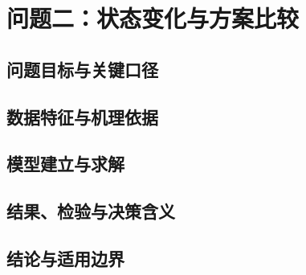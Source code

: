 \SectionStart
\section{问题二：状态变化与方案比较}
\subsection{问题目标与关键口径}
\subsection{数据特征与机理依据}
\subsection{模型建立与求解}
\subsection{结果、检验与决策含义}
\subsection{结论与适用边界}
